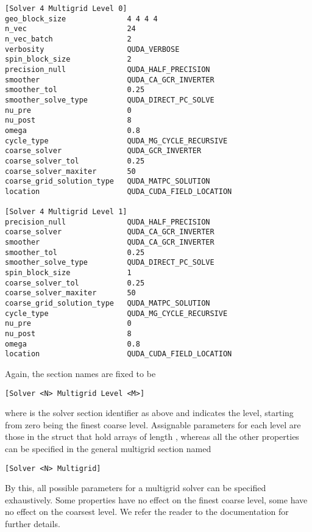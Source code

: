 \begin{verbatim}
[Solver 4 Multigrid Level 0]
geo_block_size              4 4 4 4
n_vec                       24
n_vec_batch                 2
verbosity                   QUDA_VERBOSE
spin_block_size             2
precision_null              QUDA_HALF_PRECISION
smoother                    QUDA_CA_GCR_INVERTER
smoother_tol                0.25
smoother_solve_type         QUDA_DIRECT_PC_SOLVE
nu_pre                      0
nu_post                     8
omega                       0.8
cycle_type                  QUDA_MG_CYCLE_RECURSIVE
coarse_solver               QUDA_GCR_INVERTER
coarse_solver_tol           0.25
coarse_solver_maxiter       50
coarse_grid_solution_type   QUDA_MATPC_SOLUTION
location                    QUDA_CUDA_FIELD_LOCATION

[Solver 4 Multigrid Level 1]
precision_null              QUDA_HALF_PRECISION
coarse_solver               QUDA_CA_GCR_INVERTER
smoother                    QUDA_CA_GCR_INVERTER
smoother_tol                0.25
smoother_solve_type         QUDA_DIRECT_PC_SOLVE
spin_block_size             1
coarse_solver_tol           0.25
coarse_solver_maxiter       50
coarse_grid_solution_type   QUDA_MATPC_SOLUTION
cycle_type                  QUDA_MG_CYCLE_RECURSIVE
nu_pre                      0
nu_post                     8
omega                       0.8
location                    QUDA_CUDA_FIELD_LOCATION
\end{verbatim}
Again, the section names are fixed to be
\begin{verbatim}
[Solver <N> Multigrid Level <M>]
\end{verbatim}
where  is the solver section identifier as above and  indicates the level, starting from zero being the finest coarse level.
Assignable parameters for each level are those in the  struct that hold arrays of length , whereas all the other properties can be specified in the general multigrid section named
\begin{verbatim}
[Solver <N> Multigrid]
\end{verbatim}
By this, all possible parameters for a multigrid solver can be specified exhaustively.
Some properties have no effect on the finest coarse level, some have no effect on the coarsest level.
We refer the reader to the \quda documentation for further details.

